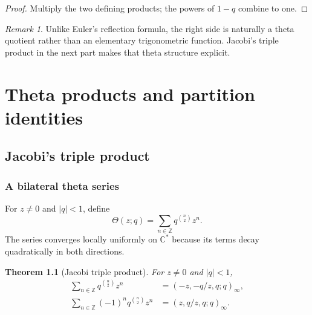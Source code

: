 \documentclass[11pt,oneside,openany]{book}
\newtheorem{theorem}{Theorem}[chapter]
\theoremstyle{definition}
\theoremstyle{remark}
\newtheorem{remark}[remark]{Remark}
\newcommand{\C}{\mathbb C}
\newcommand{\Z}{\mathbb Z}
\newcommand{\abs}[1]{\lvert #1\rvert}
\begin{document}
\begin{proof}
Multiply the two defining products; the powers of $1-q$ combine to one.
\end{proof}

\begin{remark}
Unlike Euler's reflection formula, the right side is naturally a theta quotient rather than an elementary trigonometric function.  Jacobi's triple product in the next part makes that theta structure explicit.
\end{remark}


\part{Theta products and partition identities}

\chapter{Jacobi's triple product}\label{chap:jtp}

\section{A bilateral theta series}

For $z\ne0$ and $\abs q<1$, define
\[
 \Theta(z;q)=\sum_{n\in\Z}q^{\binom n2}z^n.
\]
The series converges locally uniformly on $\C^*$ because its terms decay quadratically in both directions.

\begin{theorem}[Jacobi triple product]\label{thm:jtp}
For $z\ne0$ and $\abs q<1$,
\begin{align}
 \sum_{n\in\Z}q^{\binom n2}z^n
 &=(-z,-q/z,q;q)_\infty,\label{eq:jtp-plus}\\
 \sum_{n\in\Z}(-1)^nq^{\binom n2}z^n
 &=(z,q/z,q;q)_\infty.\label{eq:jtp-minus}
\end{align}
\end{theorem}
\end{document}
